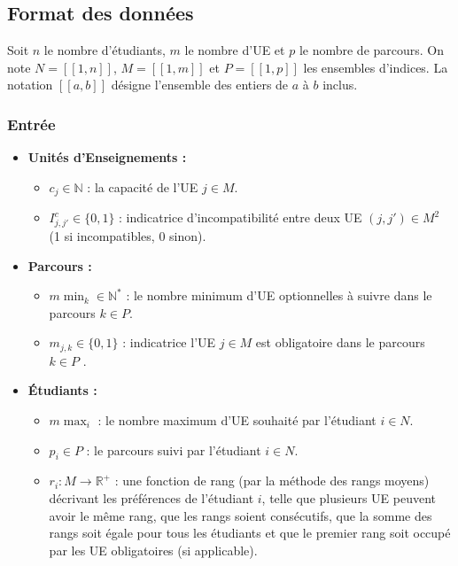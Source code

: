 \documentclass{rapport}
\theoremstyle{definition}
\theoremstyle{remark}
\theoremstyle{plain}
\theoremstyle{definition}
\theoremstyle{definition}
\theoremstyle{remark}
\theoremstyle{definition}
\newcommand{\llbracket}{[\![}
\newcommand{\rrbracket}{]\!]}
\begin{document}
\subsection{Format des données}
Soit $n$ le nombre d'étudiants, $m$ le nombre d'UE et $p$ le nombre de parcours.
On note $N = \llbracket 1,n \rrbracket$, $M = \llbracket 1,m \rrbracket$ et $P = \llbracket 1,p \rrbracket$ les ensembles d'indices.
La notation $\llbracket a,b \rrbracket$ désigne l'ensemble des entiers de $a$ à $b$ inclus.

\subsubsection{Entrée}
\begin{itemize}
    \item \textbf{Unités d'Enseignements :}
    \begin{itemize}
        \item $c_j \in \mathbb{N}$ : la capacité de l'UE $j \in M$.
        \item $I^c_{j,j'} \in \{0,1\}$ : indicatrice d'incompatibilité entre deux UE $(j,j') \in M^2$ (1 si incompatibles, 0 sinon).
    \end{itemize}

    \item \textbf{Parcours :}
    \begin{itemize}
        \item $m\!\min_k \in \mathbb{N}^*$ : le nombre minimum d'UE optionnelles à suivre dans le parcours $k \in P$.
        \item $m_{j,k} \in \{0,1\}$ : indicatrice \og l'UE $j \in M$ est obligatoire dans le parcours $k \in P$ \fg{}.
    \end{itemize}

    \item \textbf{Étudiants :}
    \begin{itemize}
        \item $m\!\max_i$ : le nombre maximum d'UE souhaité par l'étudiant $i \in N$.
        \item $p_i \in P$ : le parcours suivi par l'étudiant $i \in N$.
        \item $r_i : M \to \mathbb{R}^{+}$ : une fonction de rang (par la méthode des rangs moyens) décrivant les préférences de l'étudiant $i$, telle que plusieurs UE peuvent avoir le même rang, que les rangs soient consécutifs, que la somme des rangs soit égale pour tous les étudiants et que le premier rang soit occupé par les UE obligatoires (si applicable).
    \end{itemize}
\end{itemize}
\end{document}
